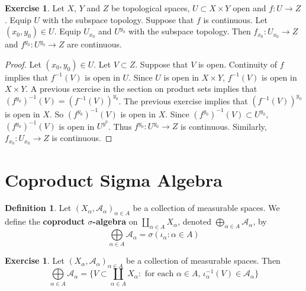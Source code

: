 \documentclass{book}
\theoremstyle{definition}
\newtheorem{defn}[definition]{Definition}
\newtheorem{ex}[definition]{Exercise}
\newcommand{\al}{\alpha}
\newcommand{\sig}{\sigma}
\newcommand{\MA}{\mathcal{A}}
\DeclareMathOperator*{\0}{\mbf{0}}
\DeclareMathOperator*{\1}{\mbf{1}}
\begin{document}
	\begin{ex}
		Let $X$, $Y$ and $Z$ be topological spaces, $U \subset X \times Y$ open and $f: U \rightarrow Z$. Equip $U$ with the subspace topology. Suppose that $f$ is continuous. Let $(x_0, y_0) \in U$. Equip $U_{x_0}$ and $U^{y_0}$ with the subspace topology. Then $f_{x_0}:U_{x_0} \rightarrow Z$ and $f^{y_0}: U^{y_0} \rightarrow Z$ are continuous.
	\end{ex}
	
	\begin{proof}
		Let $(x_0, y_0) \in U$. Let $V \subset Z$. Suppose that $V$ is open. Continuity of $f$ implies that $f^{-1}(V)$ is open in $U$. Since $U$ is open in $X \times Y$, $f^{-1}(V)$ is open in $X \times Y$. A previous exercise in the section on product sets implies that $(f^{y_0})^{-1}(V) = (f^{-1}(V))^{y_0}$. The previous exercise implies that $(f^{-1}(V))^{y_0}$ is open in $X$. So $(f^{y_0})^{-1}(V)$ is open in $X$. Since $(f^{y_0})^{-1}(V) \subset U^{y_0}$, $(f^{y_0})^{-1}(V)$ is open in $U^{y^0}$. Thus $f^{y_0}: U^{y_0} \rightarrow Z$ is continuous. Similarly, $f_{x_0}: U_{x_0} \rightarrow Z$ is continuous.
	\end{proof}


	
	
	
	
	
	
	
	
	
	
	
	
	
	
	
	
	
	
	
	
	\newpage
	\section{Coproduct Sigma Algebra}
	
	\begin{defn}
		Let $(X_{\al}, \MA_{\al})_{\al \in A}$ be a collection of measurable spaces. We define the \textbf{coproduct $\sig$-algebra} on $\coprod\limits_{\al \in A}X_{\al}$, denoted $\bigoplus\limits_{\al \in A} \MA_{\al}$, by 
		$$\bigoplus\limits_{\al \in A} \MA_{\al} = \sig (\iota_{\al}: \al \in A)$$
	\end{defn}

	\begin{ex}
		Let $(X_{\al}, \MA_{\al})_{\al \in A}$ be a collection of measurable spaces. Then $$\bigoplus\limits_{\al \in A} \MA_{\al} = \{V \subset \coprod_{\al \in A}  X_{\al}: \text{ for each $\al \in A$, $\iota_{\al}^{-1}(V) \in \MA_{\al}$}\}$$
	\end{ex}
\end{document}
